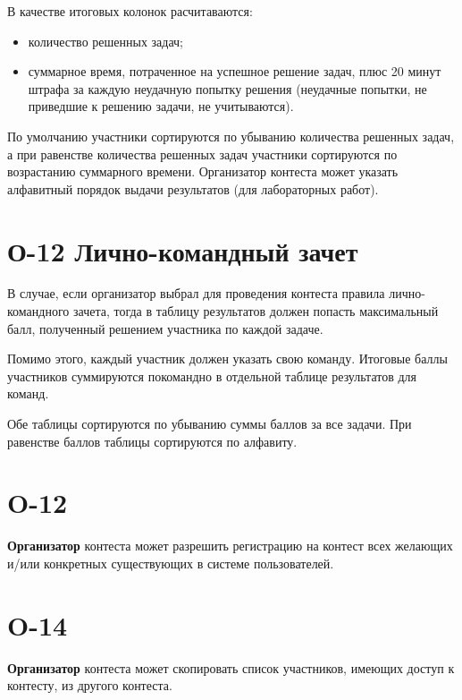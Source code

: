 \documentclass{book}
\newcommand{\newcard}[1]{\newpage \section*{#1}}
\begin{document}
	В качестве итоговых колонок расчитаваются:
	\begin{itemize}
		\item количество решенных задач;
		\item суммарное время, потраченное на успешное решение задач, плюс 20 минут штрафа за каждую неудачную попытку решения (неудачные попытки, не приведшие к решению задачи, не учитываются).
	\end{itemize} 
	
	По умолчанию участники сортируются по убыванию количества решенных задач, а при равенстве количества решенных задач участники сортируются по возрастанию суммарного времени. Организатор контеста может указать алфавитный порядок выдачи результатов (для лабораторных работ).


\newcard{О-12 Лично-командный зачет}
	В случае, если организатор выбрал для проведения контеста правила лично-командного зачета, тогда в таблицу результатов должен попасть максимальный балл, полученный решением участника по каждой задаче.

	Помимо этого, каждый участник должен указать свою команду. Итоговые баллы участников суммируются покомандно в отдельной таблице результатов для команд.

	Обе таблицы сортируются по убыванию суммы баллов за все задачи. При равенстве баллов таблицы сортируются по алфавиту.

\newcard{O-12}
	\textbf{Организатор} контеста может разрешить регистрацию на контест всех желающих и/или конкретных существующих в системе пользователей.

\newcard{O-14}
	\textbf{Организатор} контеста может скопировать список участников, имеющих доступ к контесту, из другого контеста.
\end{document}
